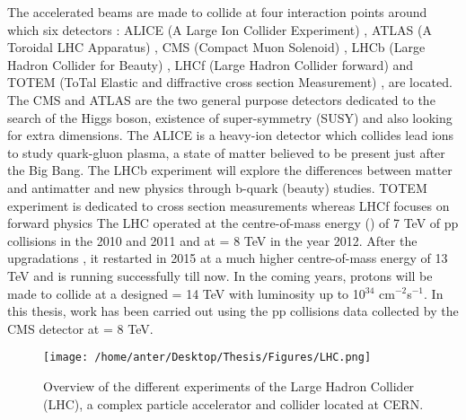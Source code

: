 The accelerated beams are made to collide at four interaction points around which six detectors : ALICE (A Large Ion Collider Experiment) \cite{Aamodt:2008zz}, ATLAS (A Toroidal LHC Apparatus) \cite{Aad:2008zzm},  CMS (Compact Muon Solenoid) \cite{Chatrchyan:2008aa,Bayatian:2006nff,Ball:2007zza}, LHCb (Large Hadron Collider for Beauty) \cite{Alves:2008zz}, LHCf (Large Hadron Collider forward)\cite{Adriani:2008zz} and TOTEM (ToTal Elastic and diffractive cross section Measurement) \cite{Anelli:2008zza}, are located. The CMS and ATLAS are the two general purpose detectors dedicated to the search of the Higgs boson, existence of super-symmetry (SUSY) and also looking for extra dimensions. The ALICE is a heavy-ion detector which collides lead ions to study quark-gluon plasma, a state of matter believed to be present just after the Big Bang. The LHCb experiment will explore the differences between matter and antimatter and new physics through b-quark (beauty) studies. TOTEM experiment is dedicated to cross section measurements whereas LHCf focuses on forward physics  The LHC operated at the centre-of-mass energy (\cme) of 7 TeV of pp collisions in the 2010 and 2011 and at \cme = 8 TeV in the year 2012. After the upgradations , it restarted in 2015 at a much higher centre-of-mass energy of 13 TeV and is running successfully till now. In the coming years, protons will be made to collide at a designed \cme = 14 TeV with luminosity up to 10$^{34}$ cm$^{-2}$s$^{-1}$. In this thesis, work has been carried out using the pp collisions data collected by the CMS detector at \cme = 8 TeV.

\begin{figure}[!h]
 \begin{center} 
 \hspace*{-5mm}
 \texttt{[image: /home/anter/Desktop/Thesis/Figures/LHC.png]}\\
 \vspace*{5mm}
 \caption[LHC]{Overview of the different experiments of the Large Hadron Collider (LHC), a complex particle accelerator and collider located at CERN.\footnotemark}
 \label{fig:LHC}
 \end{center}
\end{figure}

